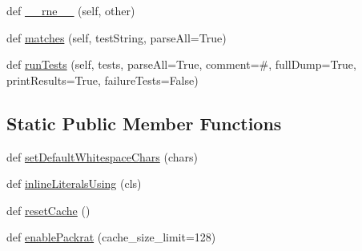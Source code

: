 \begin{DoxyCompactItemize}
\item 
def \hyperlink{classpkg__resources_1_1__vendor_1_1pyparsing_1_1ParserElement_abdc153f5c1b26432e96c8c5b45e29a11}{\+\_\+\+\_\+rne\+\_\+\+\_\+} (self, other)
\item 
def \hyperlink{classpkg__resources_1_1__vendor_1_1pyparsing_1_1ParserElement_ac13ecd02ff2ecec127dcc7e1cc94311c}{matches} (self, test\+String, parse\+All=True)
\item 
def \hyperlink{classpkg__resources_1_1__vendor_1_1pyparsing_1_1ParserElement_a9b310e792e7644f09f282e822487f333}{run\+Tests} (self, tests, parse\+All=True, comment=\textquotesingle{}\#\textquotesingle{}, full\+Dump=True, print\+Results=True, failure\+Tests=False)
\end{DoxyCompactItemize}
\subsection*{Static Public Member Functions}
\begin{DoxyCompactItemize}
\item 
def \hyperlink{classpkg__resources_1_1__vendor_1_1pyparsing_1_1ParserElement_af1dc7ba7745bc9323f0559b197abe429}{set\+Default\+Whitespace\+Chars} (chars)
\item 
def \hyperlink{classpkg__resources_1_1__vendor_1_1pyparsing_1_1ParserElement_a0cc7c1046ec15301a82d135bad3190ba}{inline\+Literals\+Using} (cls)
\item 
def \hyperlink{classpkg__resources_1_1__vendor_1_1pyparsing_1_1ParserElement_aaa05acff87a4316ef93406a9f878d47c}{reset\+Cache} ()
\item 
def \hyperlink{classpkg__resources_1_1__vendor_1_1pyparsing_1_1ParserElement_a93be52be442d95742db8b799a5a1c7b3}{enable\+Packrat} (cache\+\_\+size\+\_\+limit=128)
\end{DoxyCompactItemize}
